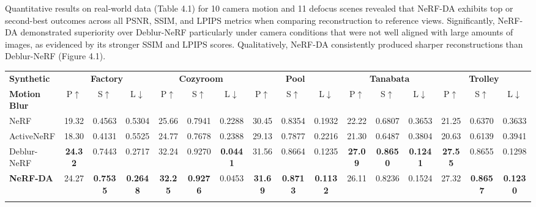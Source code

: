 Quantitative results on real-world data (Table 4.1) for 10 camera motion and 11 defocus scenes revealed that NeRF-DA exhibits top or second-best outcomes across all PSNR, SSIM, and LPIPS metrics when comparing reconstruction to reference views. Significantly, NeRF-DA demonstrated superiority over Deblur-NeRF particularly under camera conditions that were not well aligned with large amounts of images, as evidenced by its stronger SSIM and LPIPS scores. Qualitatively, NeRF-DA consistently produced sharper reconstructions than Deblur-NeRF (Figure 4.1).\cite{bib17}
\\
\begin{table}[htbp]
\centering
\setlength{\tabcolsep}{2.5pt} %
\scriptsize
\begin{tabular}{l|ccc|ccc|ccc|ccc|ccc}
\hline\hline
\textbf{Synthetic} & \multicolumn{3}{c|}{\textbf{Factory}} & \multicolumn{3}{c|}{\textbf{Cozyroom}} & \multicolumn{3}{c|}{\textbf{Pool}} & \multicolumn{3}{c|}{\textbf{Tanabata}} & \multicolumn{3}{c}{\textbf{Trolley}} \\
\cline{2-16}
\textbf{Motion Blur} & P$\uparrow$ & S$\uparrow$ & L$\downarrow$ & P$\uparrow$ & S$\uparrow$ & L$\downarrow$ & P$\uparrow$ & S$\uparrow$ & L$\downarrow$ & P$\uparrow$ & S$\uparrow$ & L$\downarrow$ & P$\uparrow$ & S$\uparrow$ & L$\downarrow$ \\
\hline
NeRF & 19.32 & 0.4563 & 0.5304 & 25.66 & 0.7941 & 0.2288 & 30.45 & 0.8354 & 0.1932 & 22.22 & 0.6807 & 0.3653 & 21.25 & 0.6370 & 0.3633 \\
ActiveNeRF & 18.30 & 0.4131 & 0.5525 & 24.77 & 0.7678 & 0.2388 & 29.13 & 0.7877 & 0.2216 & 21.30 & 0.6487 & 0.3804 & 20.63 & 0.6139 & 0.3941 \\
Deblur-NeRF & \textbf{24.32} & 0.7443 & 0.2717 & 32.24 & 0.9270 & \textbf{0.0441} & 31.56 & 0.8664 & 0.1235 & \textbf{27.09} & \textbf{0.8650} & \textbf{0.1241} & \textbf{27.55} & 0.8655 & 0.1298 \\
\textbf{NeRF-DA} & 24.27 & \textbf{0.7535} & \textbf{0.2648} & \textbf{32.25} & \textbf{0.9276} & 0.0453 & \textbf{31.69} & \textbf{0.8713} & \textbf{0.1132} & 26.11 & 0.8236 & 0.1524 & 27.32 & \textbf{0.8657} & \textbf{0.1230} \\
\hline
\multicolumn{16}{l}{} \\ %


\end{tabular}
\end{table}
